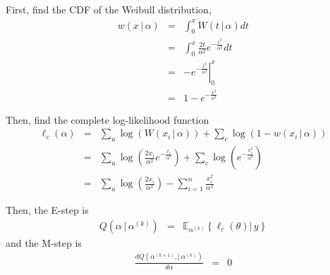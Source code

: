 \documentclass[11pt]{article}
\begin{document}
\subsection{}

First, find the CDF of the Weibull distribution,
\begin{eqnarray*}
  w\left(x\,|\,\alpha\right)&=&\int_0^xW\left(t\,|\,\alpha\right)dt\\
                            &=&\int_0^x\frac{2t}{\alpha^2}e^{-\frac{t^2}{\alpha^2}}dt\\
                            &=&\left.-e^{-\frac{t^2}{\alpha^2}}\right|_0^x\\
                            &=&1-e^{-\frac{x^2}{\alpha^2}}
\end{eqnarray*}

Then, find the complete log-likelihood function
\begin{eqnarray*}
  \ell_c\left(\alpha\right)&=&\sum_u\log\left(W\left(x_i\,|\,\alpha\right)\right)+\sum_c\log\left(1-w\left(x_i\,|\,\alpha\right)\right)\\
                           &=&\sum_u\log\left(\frac{2x_i}{\alpha^2}e^{-\frac{x_i}{\alpha^2}}\right)+\sum_c\log\left(e^{-\frac{x_i^2}{\alpha^2}}\right)\\
                           &=&\sum_u\log\left(\frac{2x_i}{\alpha^2}\right)-\sum_{i=1}^n\frac{x_i^2}{\alpha^2}
\end{eqnarray*}

Then, the E-step is
\begin{eqnarray*}
  Q(\alpha\,|\,\alpha^{\left(k\right)})&=&\mathbb{E}_{\alpha^{\left(k\right)}}\left\{\ell_c\left(\theta\right)|\,y\right\}
\end{eqnarray*}
and the M-step is
\begin{eqnarray*}
  \frac{dQ(\alpha^{\left(k+1\right)},|\,\alpha^{\left(k\right)})}{d\alpha}&=&0
\end{eqnarray*}

\subsection{}

\section{}
\end{document}
